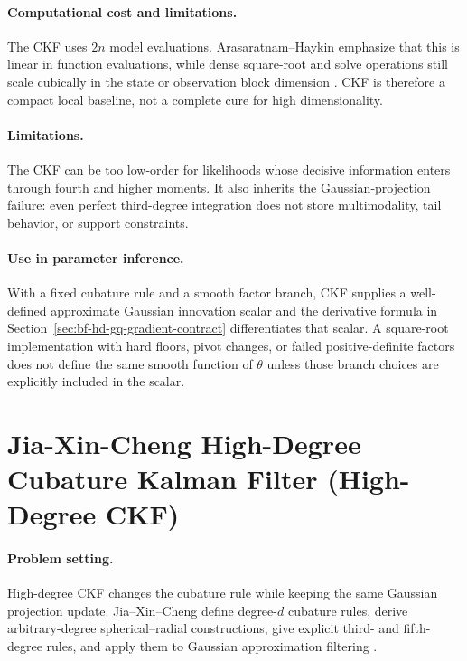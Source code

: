 \paragraph{Computational cost and limitations.}
The CKF uses \(2n\) model evaluations.  Arasaratnam--Haykin emphasize that this
is linear in function evaluations, while dense square-root and solve operations
still scale cubically in the state or observation block dimension
\citep{arasaratnam2009cubature}.  CKF is therefore a compact local baseline,
not a complete cure for high dimensionality.

\paragraph{Limitations.}
The CKF can be too low-order for likelihoods whose decisive information enters
through fourth and higher moments.  It also inherits the Gaussian-projection
failure: even perfect third-degree integration does not store multimodality,
tail behavior, or support constraints.

\paragraph{Use in parameter inference.}
With a fixed cubature rule and a smooth factor branch, CKF supplies a
well-defined approximate Gaussian innovation scalar and the derivative formula
in Section~\ref{sec:bf-hd-gq-gradient-contract} differentiates that scalar.
A square-root implementation with hard floors, pivot changes, or failed
positive-definite factors does not define the same smooth function of
\(\theta\) unless those branch choices are explicitly included in the scalar.

\section{Jia-Xin-Cheng High-Degree Cubature Kalman Filter (High-Degree CKF)}
\label{sec:bf-hd-high-degree-cubature}

\paragraph{Problem setting.}
High-degree CKF changes the cubature rule while keeping the same Gaussian
projection update.  Jia--Xin--Cheng define degree-\(d\) cubature rules, derive
arbitrary-degree spherical--radial constructions, give explicit third- and
fifth-degree rules, and apply them to Gaussian approximation filtering
\citep[Definition 3.1, Theorem 3.1, Propositions 3.1--3.2]{jia2013highdegree}.

